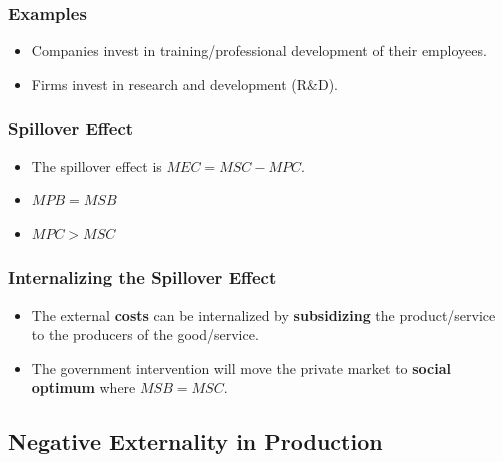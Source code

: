 \documentclass[
  letterpaper,
  DIV=11,
  numbers=noendperiod]{scrartcl}
\providecommand{\tightlist}{%
  \setlength{\itemsep}{0pt}\setlength{\parskip}{0pt}}\usepackage{longtable,booktabs,array}
\begin{document}
\hypertarget{examples-4}{%
\subsubsection{Examples}\label{examples-4}}

\begin{itemize}
\tightlist
\item
  Companies invest in training/professional development of their
  employees.
\item
  Firms invest in research and development (R\&D).
\end{itemize}

\hypertarget{spillover-effect-2}{%
\subsubsection{Spillover Effect}\label{spillover-effect-2}}

\begin{itemize}
\tightlist
\item
  The spillover effect is \(MEC = MSC-MPC\).
\item
  \(MPB = MSB\)
\item
  \(MPC > MSC\)
\end{itemize}

\hypertarget{internalizing-the-spillover-effect-2}{%
\subsubsection{Internalizing the Spillover
Effect}\label{internalizing-the-spillover-effect-2}}

\begin{itemize}
\tightlist
\item
  The external \textbf{costs} can be internalized by
  \textbf{subsidizing} the product/service to the producers of the
  good/service.
\item
  The government intervention will move the private market to
  \textbf{social optimum} where \(MSB = MSC\).
\end{itemize}

\newpage{}

\hypertarget{negative-externality-in-production}{%
\subsection{Negative Externality in
Production}\label{negative-externality-in-production}}
\end{document}
